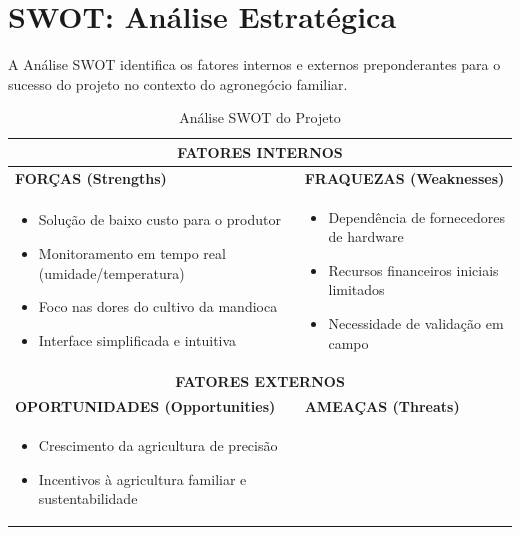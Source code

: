 \documentclass[11pt,a4paper]{article}
\begin{document}
\section{SWOT: Análise Estratégica}

A Análise SWOT \cite{oliveira2023} identifica os fatores internos e externos preponderantes para o sucesso do projeto no contexto do agronegócio familiar.

\begin{table}[H]
\centering
\caption{Análise SWOT do Projeto}
\label{tab:swot}
\begin{tabular}{|p{7.2cm}|p{7.2cm}|}
\hline
\multicolumn{2}{|c|}{\cellcolor{secondarycolor!20}\textbf{FATORES INTERNOS}} \\
\hline
\textbf{FORÇAS (Strengths)} & \textbf{FRAQUEZAS (Weaknesses)} \\
\hline
\begin{minipage}[t]{7cm}
\begin{itemize}[leftmargin=*]
    \item Solução de baixo custo para o produtor
    \item Monitoramento em tempo real (umidade/temperatura)
    \item Foco nas dores do cultivo da mandioca
    \item Interface simplificada e intuitiva
\end{itemize}
\end{minipage}
&
\begin{minipage}[t]{7cm}
\begin{itemize}[leftmargin=*]
    \item Dependência de fornecedores de hardware
    \item Recursos financeiros iniciais limitados
    \item Necessidade de validação em campo
\end{itemize}
\end{minipage}
\\
\hline
\multicolumn{2}{|c|}{\cellcolor{secondarycolor!20}\textbf{FATORES EXTERNOS}} \\
\hline
\textbf{OPORTUNIDADES (Opportunities)} & \textbf{AMEAÇAS (Threats)} \\
\hline
\begin{minipage}[t]{7cm}
\begin{itemize}[leftmargin=*]
    \item Crescimento da agricultura de precisão
    \item Incentivos à agricultura familiar e sustentabilidade

\end{itemize}
\end{minipage}
\end{tabular}
\end{table}
\end{document}
